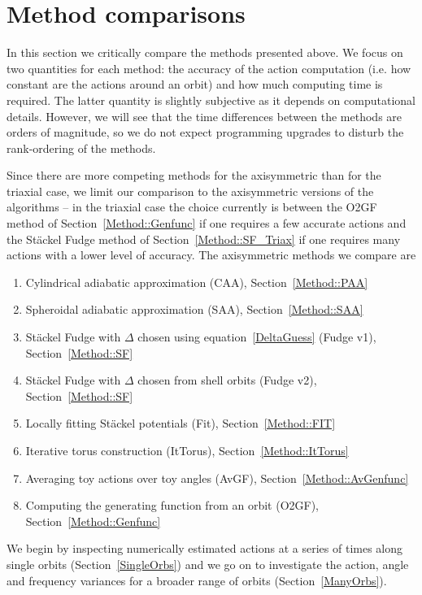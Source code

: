 \documentclass[useAMS,usenatbib,fleqn,a4paper]{mn2e}
\begin{document}
\section{Method comparisons}\label{Sect::MethodComparison}

In this section we critically compare the methods presented
above. We focus on two quantities for each method: the accuracy of
the action computation (i.e. how constant are the actions around an orbit)
and how much computing time is required. The latter quantity is
slightly subjective as it depends on  computational
details. However, we will see that the time differences between the methods
are orders of magnitude, so we do not expect programming upgrades to disturb
the rank-ordering of the methods.

Since there are more competing methods for the
axisymmetric than for the triaxial case, 
we limit our comparison to the axisymmetric versions of the
algorithms -- in the triaxial case the choice currently is between
the O2GF method of Section~\ref{Method::Genfunc} if one
requires a few accurate actions and the St\"ackel Fudge method of
Section~\ref{Method::SF_Triax} if one requires many actions with a lower
level of accuracy. The  axisymmetric methods we compare are
 \begin{enumerate}
\item Cylindrical adiabatic approximation (CAA), Section~\ref{Method::PAA}
\item Spheroidal adiabatic approximation (SAA), Section~\ref{Method::SAA}
\item St\"ackel Fudge with $\Delta$ chosen using equation~\eqref{DeltaGuess} (Fudge v1), Section~\ref{Method::SF}
\item St\"ackel Fudge with $\Delta$ chosen from shell orbits (Fudge v2), Section~\ref{Method::SF}
\item Locally fitting St\"ackel potentials (Fit), Section~\ref{Method::FIT}
\item Iterative torus construction (ItTorus), Section~\ref{Method::ItTorus}
\item Averaging toy actions over toy angles (AvGF), Section~\ref{Method::AvGenfunc}
\item Computing the generating function  from an orbit (O2GF), Section~\ref{Method::Genfunc}
\end{enumerate}
 We begin by inspecting numerically estimated actions at a series of times
along single orbits (Section~\ref{SingleOrbs}) and we go on to investigate
the action, angle and frequency variances for a broader range of orbits
(Section~\ref{ManyOrbs}).
\end{document}
